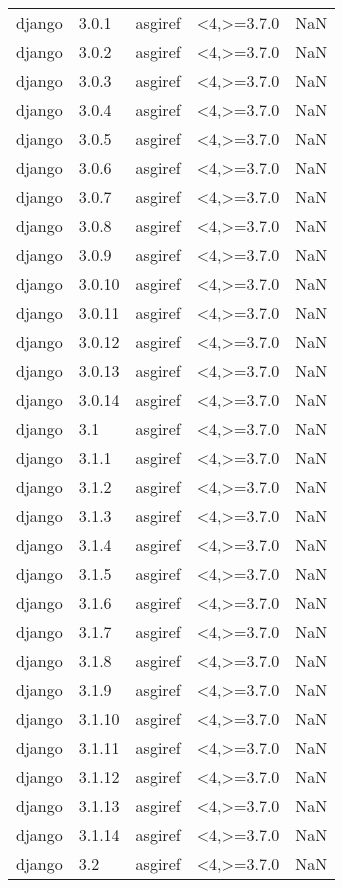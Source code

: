 \begin{tabular}{llllr}
django & 3.0.1 & asgiref & <4,>=3.7.0 & NaN \\
django & 3.0.2 & asgiref & <4,>=3.7.0 & NaN \\
django & 3.0.3 & asgiref & <4,>=3.7.0 & NaN \\
django & 3.0.4 & asgiref & <4,>=3.7.0 & NaN \\
django & 3.0.5 & asgiref & <4,>=3.7.0 & NaN \\
django & 3.0.6 & asgiref & <4,>=3.7.0 & NaN \\
django & 3.0.7 & asgiref & <4,>=3.7.0 & NaN \\
django & 3.0.8 & asgiref & <4,>=3.7.0 & NaN \\
django & 3.0.9 & asgiref & <4,>=3.7.0 & NaN \\
django & 3.0.10 & asgiref & <4,>=3.7.0 & NaN \\
django & 3.0.11 & asgiref & <4,>=3.7.0 & NaN \\
django & 3.0.12 & asgiref & <4,>=3.7.0 & NaN \\
django & 3.0.13 & asgiref & <4,>=3.7.0 & NaN \\
django & 3.0.14 & asgiref & <4,>=3.7.0 & NaN \\
django & 3.1 & asgiref & <4,>=3.7.0 & NaN \\
django & 3.1.1 & asgiref & <4,>=3.7.0 & NaN \\
django & 3.1.2 & asgiref & <4,>=3.7.0 & NaN \\
django & 3.1.3 & asgiref & <4,>=3.7.0 & NaN \\
django & 3.1.4 & asgiref & <4,>=3.7.0 & NaN \\
django & 3.1.5 & asgiref & <4,>=3.7.0 & NaN \\
django & 3.1.6 & asgiref & <4,>=3.7.0 & NaN \\
django & 3.1.7 & asgiref & <4,>=3.7.0 & NaN \\
django & 3.1.8 & asgiref & <4,>=3.7.0 & NaN \\
django & 3.1.9 & asgiref & <4,>=3.7.0 & NaN \\
django & 3.1.10 & asgiref & <4,>=3.7.0 & NaN \\
django & 3.1.11 & asgiref & <4,>=3.7.0 & NaN \\
django & 3.1.12 & asgiref & <4,>=3.7.0 & NaN \\
django & 3.1.13 & asgiref & <4,>=3.7.0 & NaN \\
django & 3.1.14 & asgiref & <4,>=3.7.0 & NaN \\
django & 3.2 & asgiref & <4,>=3.7.0 & NaN \\

\end{tabular}
